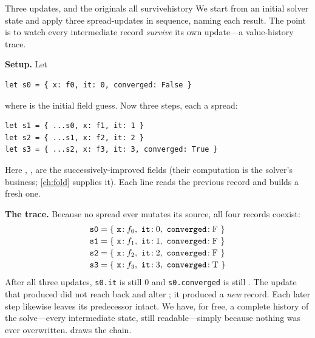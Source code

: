 \begin{workedexample}{Three updates, and the originals all survive}{history}
We start from an initial solver state and apply three spread-updates in sequence,
naming each result. The point is to watch every intermediate record \emph{survive}
its own update---a value-history trace.

\textbf{Setup.} Let
\begin{lstlisting}[style=l4style]
let s0 = { x: f0, it: 0, converged: False }
\end{lstlisting}
where  is the initial field guess. Now three steps, each a spread:
\begin{lstlisting}[style=l4style]
let s1 = { ...s0, x: f1, it: 1 }
let s2 = { ...s1, x: f2, it: 2 }
let s3 = { ...s2, x: f3, it: 3, converged: True }
\end{lstlisting}
Here , ,  are the successively-improved fields (their
computation is the solver's business; \cref{ch:fold} supplies it). Each line
reads the previous record and builds a fresh one.

\tcblower
\textbf{The trace.} Because no spread ever mutates its source, all four records
coexist:
\[
\begin{array}{l@{\;=\;}l}
\code{s0} & \{\ \code{x}\!: f_0,\ \code{it}\!: 0,\ \code{converged}\!: \mathrm{F}\ \} \\[2pt]
\code{s1} & \{\ \code{x}\!: f_1,\ \code{it}\!: 1,\ \code{converged}\!: \mathrm{F}\ \} \\[2pt]
\code{s2} & \{\ \code{x}\!: f_2,\ \code{it}\!: 2,\ \code{converged}\!: \mathrm{F}\ \} \\[2pt]
\code{s3} & \{\ \code{x}\!: f_3,\ \code{it}\!: 3,\ \code{converged}\!: \mathrm{T}\ \}
\end{array}
\]
After all three updates, \lstinline[style=l4style]|s0.it| is still $0$ and
\lstinline[style=l4style]|s0.converged| is still . The update that
produced  did not reach back and alter ; it produced a
\emph{new} record. Each later step likewise leaves its predecessor intact. We
have, for free, a complete history of the solve---every intermediate state, still
readable---simply because nothing was ever overwritten.  draws the
chain.
\end{workedexample}

